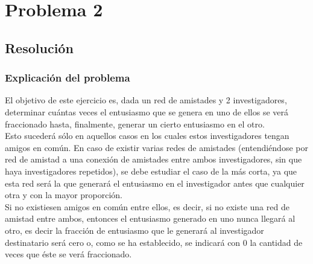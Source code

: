 \section{Problema 2}

\subsection{Resolución}

\subsubsection{Explicación del problema}
\indent El objetivo de este ejercicio es, dada un red de amistades y 2
investigadores, determinar cuántas veces el entusiasmo que se genera en uno de
ellos se verá fraccionado hasta, finalmente, generar un cierto entusiasmo en el
otro. \\
\indent Esto sucederá sólo en aquellos casos en los cuales estos investigadores
tengan amigos en común. En caso de existir varias redes de amistades
(entendiéndose por red de amistad a una conexión de amistades entre ambos
investigadores, sin que haya investigadores repetidos), se debe estudiar el caso
de la más corta, ya que esta red será la que generará el entusiasmo en el
investigador antes que cualquier otra y con la mayor proporción. \\
\indent Si no existiesen amigos en común entre ellos, es decir, si no existe una
red de amistad entre ambos, entonces el entusiasmo generado en uno nunca llegará
al otro, es decir la fracción de entusiasmo que le generará al investigador
destinatario será cero o, como se ha establecido, se indicará con $0$ la
cantidad de veces que éste se verá fraccionado.

